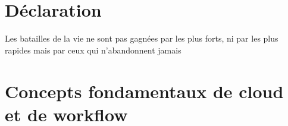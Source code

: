 \documentclass[12pt,twoside]{report}
\author{Zerrouki Djamel}
\theoremstyle{plain}
\theoremstyle{definition}
\theoremstyle{Remarque}
\begin{document}
% 
              

               
 
 
 
 



\clearpage

\printglossary[title=Special Terms, toctitle=List of terms]
 
 

  
   
  
 
 
 
 \chapter*{Déclaration}
 Les batailles de la vie ne sont pas gagnées par les plus forts, ni par les plus rapides mais par ceux qui n'abandonnent jamais
 
 

 




  
 





 



\tableofcontents

\listoffigures

\listoftables




 
 
 
 
\fancyhead{}
\chapter{Concepts fondamentaux de cloud et de workflow }

\end{document}
